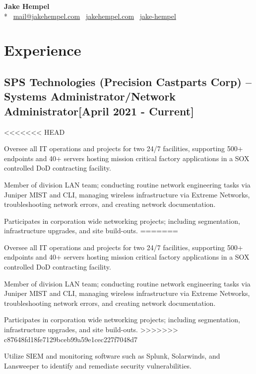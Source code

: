\documentclass{article}
\begin{document}
\begin{samepage}
\begin{center}
\huge{\textbf{Jake Hempel}} \\*
\large{\faEnvelope \, \href{mailto:mail@jakehempel.com}{mail@jakehempel.com}
\faGlobe \, \href{https://jakehempel.com}{jakehempel.com}}
\faLinkedinSquare \, \href{https://www.linkedin.com/in/jake-hempel/}{jake-hempel}
\end{center}

\section{Experience}
\subsection{SPS Technologies (Precision Castparts Corp) -- Systems Administrator/Network Administrator[April 2021 - Current]}
\begin{compactitem}
<<<<<<< HEAD
	\item Oversee all IT operations and projects for two 24/7 facilities, supporting 500+ endpoints and 40+ servers hosting mission critical factory applications in a SOX controlled DoD contracting facility. 
	\item Member of division LAN team; conducting routine network engineering tasks via Juniper MIST and CLI, managing wireless infrastructure via Extreme Networks, troubleshooting network errors, and creating network documentation.
	\item Participates in corporation wide networking projects; including segmentation, infrastructure upgrades, and site build-outs. 
=======
	\item Oversee all IT operations and projects for two 24/7 facilities, supporting 500+ endpoints and 40+ servers hosting mission critical factory applications in a SOX controlled DoD contracting facility.
	\item Member of division LAN team; conducting routine network engineering tasks via Juniper MIST and CLI, managing wireless infrastructure via Extreme Networks, troubleshooting network errors, and creating network documentation.
	\item Participates in corporation wide networking projects; including segmentation, infrastructure upgrades, and site build-outs.
>>>>>>> c87648fd18fe7129bceb99a59e1cec227f7048d7
	\item Utilize SIEM and monitoring software such as Splunk, Solarwinds, and Lansweeper to identify and remediate security vulnerabilities.
\end{compactitem}

\end{samepage}
\end{document}

